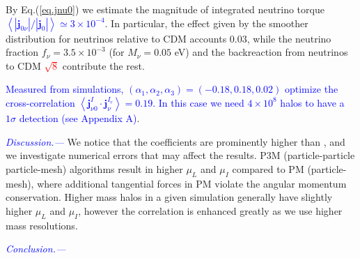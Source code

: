 \documentclass[aps,prd,twocolumn,amsmath,amssymb,amsfont,superscriptaddress]{revtex4-1}
\newcommand{\bs}{\boldsymbol}
\newcommand{\tcb}{\textcolor{blue}}
\newcommand{\tcr}{\textcolor{red}}
\begin{document}
By Eq.(\ref{eq.jnu0}) we estimate the magnitude of integrated neutrino torque \tcb{$\left\langle|\bs{j}_{0\nu}|/|\bs{j}_0|\right\rangle\simeq 3\times10^{-4}$}. In particular, the effect given by the smoother distribution for neutrinos relative to CDM accounts 0.03, while the neutrino fraction $f_\nu=3.5\times 10^{-3}$ (for $M_\nu=0.05$ eV) and the backreaction from neutrinos to CDM \tcr{$\sqrt{8}$} contribute the rest.

\tcb{Measured from simulations, $(\alpha_1,\alpha_2,\alpha_3)=(-0.18,0.18,0.02)$ optimize the cross-correlation $\left\langle\bs{j}^I_{\nu 0}\cdot\bs{j}^{I_r}_\nu\right\rangle=0.19$. In this case we need $4\times 10^8$ halos to have a $1\sigma$ detection (see Appendix A)}. 

\tcb{\textit{Discussion.---}} 
We notice that the coefficients are prominently higher than \citep{2000ApJ...532L...5L}, and we investigate numerical errors that may affect the results. P3M (particle-particle particle-mesh) algorithms result in higher $\mu_L$ and $\mu_I$ compared to PM (particle-mesh), where additional tangential forces in PM violate the angular momentum conservation. Higher mass halos in a given simulation generally have slightly higher $\mu_L$ and $\mu_I$, however the correlation is enhanced greatly as we use higher mass resolutions.

\tcb{\textit{Conclusion.---}} 


\end{document}
